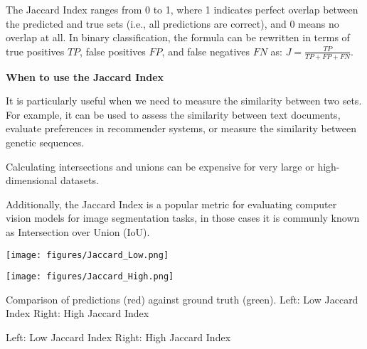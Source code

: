 The Jaccard Index ranges from 0 to 1, where 1 indicates perfect overlap between the predicted and true sets (i.e., all predictions are correct),
and 0 means no overlap at all. In binary classification, the formula can be rewritten in terms of true positives $TP$, false positives $FP$, and false negatives
$FN$ as: $J = \frac{TP}{TP + FP + FN}$. 

\textbf{When to use the Jaccard Index}

It is particularly useful when we need to measure the similarity between two sets. For example, it can be used to assess the similarity between text documents,
evaluate preferences in recommender systems, or measure the similarity between genetic sequences.

{
    \item Calculating intersections and unions can be expensive for very large or high-dimensional datasets.  
}

\clearpage

Additionally, the Jaccard Index is a popular metric for evaluating computer vision
models for image segmentation tasks, in those cases it is communly known as Intersection over Union (IoU).

\begin{minipage}{.5\textwidth}
  \centering
  \texttt{[image: figures/Jaccard\_Low.png]}
  \label{fig:test1}
\end{minipage}%
\begin{minipage}{.5\textwidth}
  \centering
  \texttt{[image: figures/Jaccard\_High.png]}
  \label{fig:test2}
\end{minipage}%

\begin{center}
    \vspace{0.75em} 
    \small Comparison of predictions (red) against ground truth (green). 
    \small Left: Low Jaccard Index Right: High Jaccard Index
\end{center}
\begin{center}
    \small Left: Low Jaccard Index Right: High Jaccard Index
\end{center}

